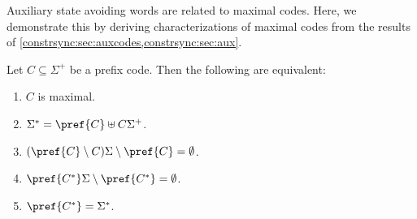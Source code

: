 Auxiliary state avoiding words are related to maximal codes. Here, we demonstrate this by deriving
characterizations of maximal codes from the results of \cref{constrsync:sec:auxcodes,constrsync:sec:aux}.

\begin{proposition} \label{constrsync:prop:prefix-maximal}
	Let $C \subseteq \Sigma^+$ be a prefix code. Then the following are equivalent:
	\begin{enumerate}
		\item \label{constrsync:prop:prefix-maximal:1} $C$ is maximal.
		
		\item \label{constrsync:prop:prefix-maximal:2} $\Sigma^* = \pref{C} \uplus C\Sigma^+$.
		
		\item \label{constrsync:prop:prefix-maximal:3} $(\pref{C} \setminus C)\Sigma \setminus \pref{C} = \emptyset$.
		
		\item \label{constrsync:prop:prefix-maximal:4} $\pref{C^*}\Sigma  \setminus \pref{C^*} = \emptyset$.
		
		\item \label{constrsync:prop:prefix-maximal:5} $\pref{C^*} = \Sigma^*$.
	\end{enumerate}	
\end{proposition}
